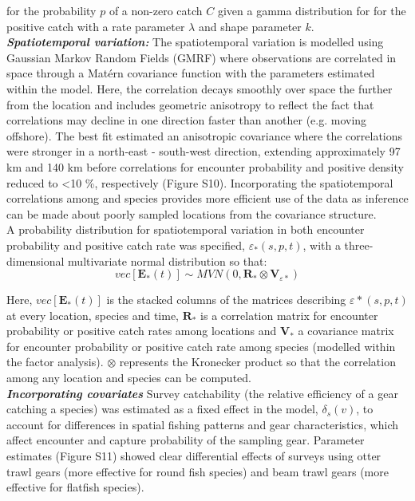 \documentclass[fleqn,10pt]{wlscirep}
\begin{document}
\begin{linenumbers}
for the probability $p$ of a non-zero catch $C$ given a gamma distribution for
for the positive catch with a rate parameter $\lambda$ and shape parameter
$k$.\\

\textbf{\textit{Spatiotemporal variation:}} The spatiotemporal variation is
modelled using Gaussian Markov Random Fields (GMRF) where observations are
correlated in space through a Matérn covariance function with the parameters
estimated within the model. Here, the correlation decays smoothly over space
the further from the location and includes geometric anisotropy to reflect the
fact that correlations may decline in one direction faster than another (e.g.
moving offshore)\cite{Thorson2013}.  The best fit estimated an anisotropic
covariance where the correlations were stronger in a north-east - south-west
direction, extending approximately 97 km and 140 km before correlations for
encounter probability and positive density reduced to \textless 10 \%,
respectively (Figure S10).  Incorporating the spatiotemporal correlations among
and species provides more efficient use of the data as inference can be made
about poorly sampled locations from the covariance structure.\\

A probability distribution for spatiotemporal variation in both encounter
probability and positive catch rate was specified, $\varepsilon_{*}(s,p,t)$,
with a three-dimensional multivariate normal distribution so that:
	\begin{equation}
		vec[\mathbf{E}_{*}(t)] \sim MVN(0,\mathbf{R}_{*} \otimes
		\mathbf{V}_{{\varepsilon}{*}})
	\end{equation}

Here, $vec[\mathbf{E}_{*}(t)]$ is the stacked columns of the matrices
describing $\varepsilon{*}(s,p,t)$ at every location, species and time,
$\mathbf{R}_{*}$ is a correlation matrix for encounter probability or positive
catch rates among locations and $\mathbf{V}_{*}$ a covariance matrix for
encounter probability or positive catch rate among species (modelled
within the factor analysis). $\otimes$ represents the Kronecker product so that
the correlation among any location and species can be
computed\cite{Thorson2017}.\\
		
\textbf{\textit{Incorporating covariates}} Survey catchability (the relative
efficiency of a gear catching a species) was estimated as a fixed effect
in the model, $\delta_{s}(v)$, to account for differences in spatial fishing
patterns and gear characteristics, which affect encounter and capture
probability of the sampling gear\cite{Thorson2014}. Parameter estimates
(Figure S11) showed clear differential effects of surveys using otter trawl
gears (more effective for round fish species) and beam trawl gears (more
effective for flatfish species).\\


\end{linenumbers}
\end{document}
